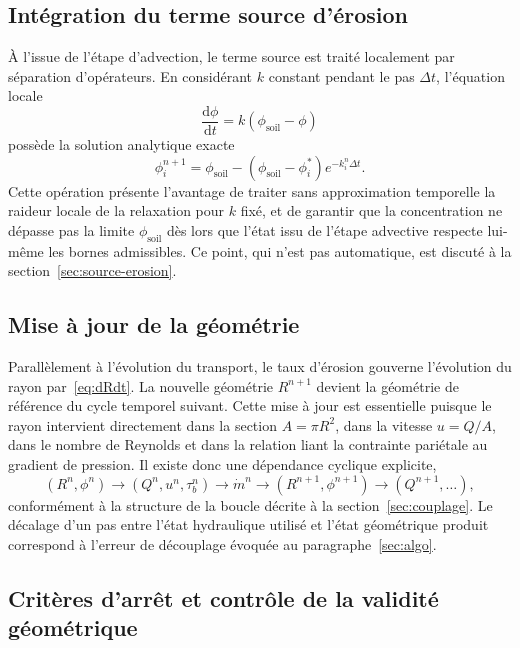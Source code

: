\documentclass[11pt,a4paper]{report}
\newcommand{\phisol}{\phi_{\mathrm{soil}}}
\newcommand{\mdot}{\dot{m}}
\newcommand{\dt}{\Delta t}
\begin{document}
\subsection{Intégration du terme source d'érosion}

À l'issue de l'étape d'advection, le terme source est traité localement par séparation d'opérateurs. En
considérant \(k\) constant pendant le pas \(\dt\), l'équation locale
\begin{equation}
\frac{\mathrm{d}\phi}{\mathrm{d}t} = k\left(\phisol - \phi\right)
\label{eq:relax}
\end{equation}
possède la solution analytique exacte
\begin{equation}
\phi_i^{n+1} = \phisol - \left(\phisol - \phi_i^*\right)e^{-k_i^n\dt}.
\label{eq:source-exacte}
\end{equation}
Cette opération présente l'avantage de traiter sans approximation temporelle la raideur locale de la
relaxation pour \(k\) fixé, et de garantir que la concentration ne dépasse pas la limite \(\phisol\) dès
lors que l'état issu de l'étape advective respecte lui-même les bornes admissibles. Ce point, qui n'est pas
automatique, est discuté à la section~\ref{sec:source-erosion}.

\subsection{Mise à jour de la géométrie}

Parallèlement à l'évolution du transport, le taux d'érosion gouverne l'évolution du rayon
par~\eqref{eq:dRdt}. La nouvelle géométrie \(R^{n+1}\) devient la géométrie de référence du cycle
temporel suivant. Cette mise à jour est essentielle puisque le rayon intervient directement dans la
section \(A = \pi R^2\), dans la vitesse \(u = Q/A\), dans le nombre de Reynolds et dans la relation liant
la contrainte pariétale au gradient de pression. Il existe donc une dépendance cyclique explicite,
\begin{equation}
\left(R^n,\phi^n\right) \to \left(Q^n,u^n,\tau_b^n\right) \to \mdot^n
\to \left(R^{n+1},\phi^{n+1}\right) \to \left(Q^{n+1},\dots\right),
\label{eq:cycle}
\end{equation}
conformément à la structure de la boucle décrite à la section~\ref{sec:couplage}. Le décalage d'un pas
entre l'état hydraulique utilisé et l'état géométrique produit correspond à l'erreur de découplage
évoquée au paragraphe~\ref{sec:algo}.

\subsection{Critères d'arrêt et contrôle de la validité géométrique}
\label{sec:criteres-arret}
\end{document}
